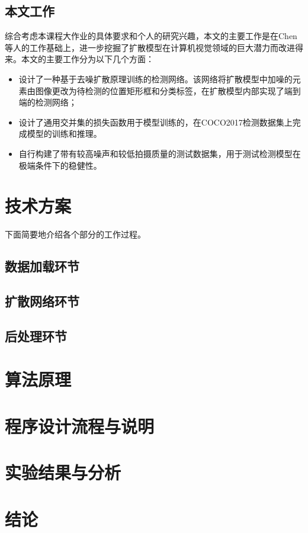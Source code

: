 \documentclass[11pt]{article}
\begin{document}
\subsection{本文工作}
综合考虑本课程大作业的具体要求和个人的研究兴趣，本文的主要工作是在Chen\cite{chenDiffusionDetDiffusionModel2023}等人的工作基础上，进一步挖掘了扩散模型\cite{hoDenoisingDiffusionProbabilistic2020}在计算机视觉领域的巨大潜力而改进得来。本文的主要工作分为以下几个方面：
\begin{itemize}
  \item 设计了一种基于去噪扩散原理训练的检测网络。该网络将扩散模型中加噪的元素由图像更改为待检测的位置矩形框和分类标签，在扩散模型内部实现了端到端的检测网络；
  \item 设计了通用交并集的损失函数用于模型训练的，在COCO2017\cite{linMicrosoftCOCOCommon2014}检测数据集上完成模型的训练和推理。
  \item 自行构建了带有较高噪声和较低拍摄质量的测试数据集，用于测试检测模型在极端条件下的稳健性。
\end{itemize}
\section{技术方案}
下面简要地介绍各个部分的工作过程。
\subsection{数据加载环节}

\subsection{扩散网络环节}

\subsection{后处理环节}

\section{算法原理}

\section{程序设计流程与说明}

\section{实验结果与分析}

\section{结论}

\newpage
\printbibliography[heading=bibliography,title=参考文献]
\end{document}
